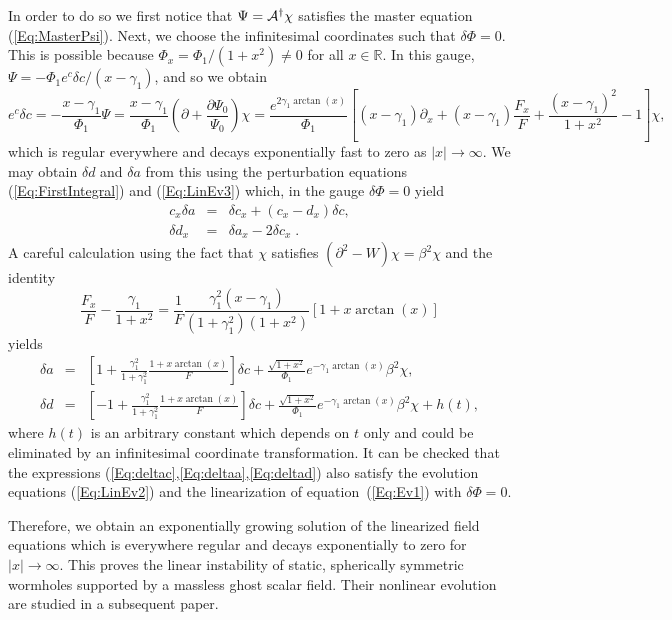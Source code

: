 \documentclass[           %
               showpacs,            %
               preprintnumbers,     %
               aps,                 %
               prd,                 %
               superscriptaddress,      %
               nofootinbib,         %
               tightenlines,        %
               floats,floatfix      %
               ]{revtex4}
\newcommand{\Real}{\mathbb{R}}
\begin{document}
In order to do so we first notice that $\Psi = {\cal A}^\dagger\chi$
satisfies the master equation (\ref{Eq:MasterPsi}). Next, we choose the
infinitesimal coordinates such that $\delta\Phi = 0$. This is possible
because $\Phi_x = \Phi_1/(1+x^2)\neq 0$ for all $x\in\Real$. In this
gauge, $\Psi = -\Phi_1 e^c\delta c/(x-\gamma_1)$, and so we obtain
\begin{equation}
e^c\delta c = -\frac{x-\gamma_1}{\Phi_1}\Psi 
 = \frac{x-\gamma_1}{\Phi_1}
   \left( \partial + \frac{\partial\Psi_0}{\Psi_0} \right)\chi
 = \frac{e^{2\gamma_1\arctan(x)}}{\Phi_1}\left[
 (x-\gamma_1)\partial_x + (x-\gamma_1)\frac{F_x}{F} 
 + \frac{(x-\gamma_1)^2}{1+x^2} - 1 \right]\chi,
\label{Eq:deltac}
\end{equation}
which is regular everywhere and decays exponentially fast to zero as
$|x|\to\infty$. We may obtain $\delta d$ and $\delta a$ from this
using the perturbation equations (\ref{Eq:FirstIntegral}) and
(\ref{Eq:LinEv3}) which, in the gauge $\delta\Phi=0$ yield
\begin{eqnarray}
c_x\delta a &=& \delta c_x + (c_x - d_x)\delta c,
\nonumber\\
\delta d_x &=& \delta a_x - 2\delta c_x\; .
\nonumber
\end{eqnarray}
A careful calculation using the fact that $\chi$ satisfies
$(\partial^2 - W)\chi = \beta^2\chi$ and the identity
\begin{equation}
\frac{F_x}{F} - \frac{\gamma_1}{1+x^2}
 = \frac{1}{F}\frac{\gamma_1^2(x-\gamma_1)}{(1+\gamma_1^2)(1+x^2)}
\left[ 1 + x\arctan(x) \right]
\label{Eq:Identity}
\end{equation}
yields
\begin{eqnarray}
\delta a &=& \left[
 1 + \frac{\gamma_1^2}{1+\gamma_1^2}\frac{1+x\arctan(x)}{F} \right]\delta c
 + \frac{\sqrt{1+x^2}}{\Phi_1} e^{-\gamma_1\arctan(x)}\beta^2\chi,
\label{Eq:deltaa}\\
\delta d &=& \left[
 -1 + \frac{\gamma_1^2}{1+\gamma_1^2}\frac{1+x\arctan(x)}{F} \right]\delta c
 + \frac{\sqrt{1+x^2}}{\Phi_1} e^{-\gamma_1\arctan(x)}\beta^2\chi
 + h(t),
\label{Eq:deltad}
\end{eqnarray}
where $h(t)$ is an arbitrary constant which depends on $t$ only and
could be eliminated by an infinitesimal coordinate transformation. It
can be checked that the expressions
(\ref{Eq:deltac},\ref{Eq:deltaa},\ref{Eq:deltad}) also satisfy the
evolution equations (\ref{Eq:LinEv2}) and the linearization of
equation~(\ref{Eq:Ev1}) with $\delta\Phi=0$.

Therefore, we obtain an exponentially growing solution of the
linearized field equations which is everywhere regular and decays
exponentially to zero for $|x| \to \infty$. This proves the linear
instability of static, spherically symmetric wormholes supported by a
massless ghost scalar field. Their nonlinear evolution are studied in
a subsequent paper.
\end{document}
